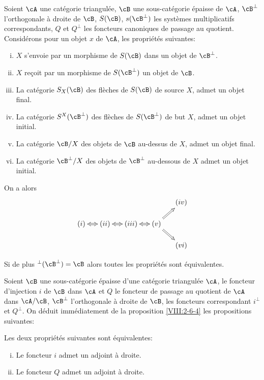 \begin{proposition}\label{VIII:2-6-4}
Soient $\cA$ une catégorie triangulée, $\cB$ une sous-catégorie 
épaisse de $\cA$, $\cB^\bot$ l'orthogonale à droite de $\cB$, $S(\cB)$, 
$s(\cB^\bot)$ les systèmes multiplicatifs correspondants, $Q$ et $Q^\bot$ les 
foncteurs canoniques de passage au quotient. Considérons pour un objet $x$ de 
$\cA$, les propriétés suivantes: 
\begin{enumerate}[(i)]
  \item $X$ s'envoie par un morphisme de $S(\cB)$ dans un objet de $\cB^\bot$. 
  \item $X$ reçoit par un morphisme de $S(\cB^\bot)$ un objet de $\cB$. 
  \item La catégorie $S_X(\cB)$ des flèches de $S(\cB)$ de source $X$, 
    admet un objet final. 
  \item La catégorie $S^X(\cB^\bot)$ des flèches de $S(\cB^\bot)$ de but 
    $X$, admet un objet initial. 
  \item La catégorie $\cB/X$ des objets de $\cB$ au-dessus de $X$, admet un 
    objet final. 
  \item La catégorie $\cB^\bot/X$ des objets de $\cB^\bot$ au-dessous de $X$ 
    admet un objet initial. 
\end{enumerate}
On a alors 
\[\xymatrix@=0.5cm{
  & & & & (iv) \\
  (i) \ar@{<=>}[r] 
    & (ii) \ar@{<=>}[r] 
    & (iii) \ar@{<=>}[r] 
    & (v) \ar@{=>}[ur] \ar@{=>}[dr] \\
  & & & & (vi) 
}\]

Si de plus $^\bot(\cB^\bot)=\cB$ alors toutes les propriétés sont 
équivalentes. 
\end{proposition}

Soient $\cB$ une sous-catégorie épaisse d'une catégorie triangulée 
$\cA$, le foncteur d'injection $i$ de $\cB$ dans $\cA$ et $Q$ le foncteur de 
passage au quotient de $\cA$ dans $\cA/\cB$, $\cB^\bot$ l'orthogonale à 
droite de $\cB$, les foncteurs correspondant $i^\bot$ et $Q^\bot$. On déduit 
immédiatement de la proposition \ref{VIII:2-6-4} les propositions suivantes: 





\begin{proposition}\label{VIII:2-6-5}
Les deux propriétés suivantes sont équivalentes: 
\begin{enumerate}[(i)]
  \item Le foncteur $i$ admet un adjoint à droite. 
  \item Le foncteur $Q$ admet un adjoint à droite. 
\end{enumerate}
\end{proposition}

